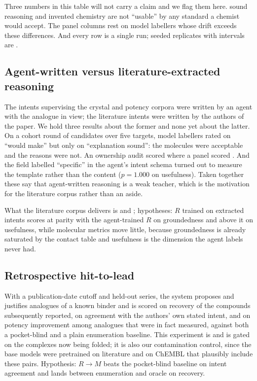 Three numbers in this table will not carry a claim and we flag them here.  sound reasoning
and  invented chemistry are not ``usable'' by any standard a chemist would accept. The
panel columns rest on model labellers whose drift exceeds these differences. And every row is a
single run; seeded replicates with intervals are .

\subsection{Agent-written versus literature-extracted reasoning}
\label{sec:agentic}

The intents supervising the crystal and potency corpora were written by an agent with the analogue
in view; the literature intents were written by the authors of the paper. We hold three results
about the former and none yet about the latter. On a cohort round of  candidates over five
targets, model labellers rated  on ``would make'' but only  on ``explanation
sound'': the molecules were acceptable and the reasons were not. An ownership audit scored 
where a panel scored . And the field labelled ``specific'' in the agent's intent schema
turned out to measure the template rather than the content ($p=1.000$ on usefulness). Taken
together these say that agent-written reasoning is a weak teacher, which is the motivation for the
literature corpus rather than an aside.

What the literature corpus delivers is  and
; hypotheses: $R$ trained on extracted
intents scores at parity with the agent-trained $R$ on groundedness and above it on usefulness,
while molecular metrics move little, because groundedness is already saturated by the contact table
and usefulness is the dimension the agent labels never had.

\subsection{Retrospective hit-to-lead}
\label{sec:retro}

With a publication-date cutoff and held-out series, the system proposes and justifies analogues of a
known binder and is scored on recovery of the compounds subsequently reported, on agreement with the
authors' own stated intent, and on potency improvement among analogues that were in fact measured,
against both a pocket-blind and a plain enumeration baseline. This experiment is
 and is gated on the complexes now being folded; it is also
our contamination control, since the base models were pretrained on literature and on ChEMBL that
plausibly include these pairs. Hypothesis: $R\!\rightarrow\!M$ beats the pocket-blind baseline on
intent agreement and lands between enumeration and oracle on recovery.

